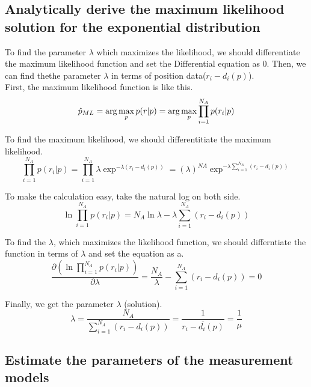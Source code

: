 \documentclass[a4paper]{article}
\begin{document}
\subsection{Analytically derive the maximum likelihood solution for the exponential distribution}

\newcommand{\prip}{p(r_i|p)}
\newcommand{\ridi}{r_i-d_i(p)}
\newcommand{\signa}{\sum\limits_{i=1}^{N_A}}
\newcommand{\mulna}{\prod\limits_{i = 1}^{N_A}}

To find the parameter $\lambda$ which maximizes the likelihood, we should differentiate the maximum likelihood function and set the Differential equation as 0. Then, we can find thethe parameter $\lambda$ in terms of position data($\ridi$).\\
\noindent
First, the maximum likelihood function is like this.\\
\begin{equation}
\hat{p}_{ML} = \arg\max\limits_{p}p(r|p) = \arg\max\limits_{p}\mulna\prip\\
\end{equation}

\noindent
To find the maximum likelihood, we should differentitiate the maximum likelihood.\\
\begin{equation}
\mulna\prip =\mulna\lambda\exp^{-\lambda(\ridi)} = (\lambda)^{NA}\exp^{-\lambda\signa(\ridi)}
\end{equation}

\noindent
To make the calculation easy, take the natural log on both side.
\begin{equation}
\ln\mulna\prip = N_A \ln\lambda - \lambda\signa(\ridi)
\end{equation}

\noindent
To find the $\lambda$, which maximizes the likelihood function, we should differntiate the function in terms of $\lambda$ and set the equation as a. 
\begin{equation}
\frac{\partial(\ln\mulna\prip)}{\partial \lambda} = \frac{N_A}{\lambda} - \signa(\ridi) =0
\end{equation}

\noindent
Finally, we get the parameter $\lambda$ (solution).
\begin{equation}
\lambda = \frac{N_A}{\signa(\ridi)} = \frac{1}{\overline{\ridi}} = \frac{1}{\mu}
\end{equation}
\clearpage

\subsection{Estimate the parameters of the measurement models}
\end{document}
